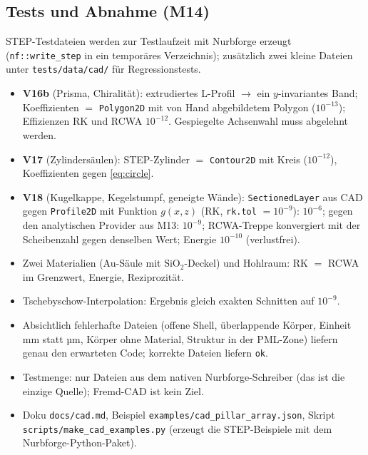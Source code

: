 \subsection{Tests und Abnahme (M14)}
STEP-Testdateien werden zur Testlaufzeit mit Nurbforge erzeugt (\verb|nf::write_step| in ein temporäres
Verzeichnis); zusätzlich zwei kleine Dateien unter \verb|tests/data/cad/| für Regressionstests.
\begin{itemize}[nosep]
  \item \textbf{V16b} (Prisma, Chiralität): extrudiertes L-Profil $\to$ ein $y$-invariantes Band; Koeffizienten
        $=$ \verb|Polygon2D| mit von Hand abgebildetem Polygon ($10^{-13}$); Effizienzen RK und RCWA $10^{-12}$.
        Gespiegelte Achsenwahl muss abgelehnt werden.
  \item \textbf{V17} (Zylindersäulen): STEP-Zylinder $=$ \verb|Contour2D| mit Kreis ($10^{-12}$), Koeffizienten gegen
        \eqref{eq:circle}.
  \item \textbf{V18} (Kugelkappe, Kegelstumpf, geneigte Wände): \verb|SectionedLayer| aus CAD gegen \verb|Profile2D| mit
        Funktion $g(x,z)$ (RK, \verb|rk.tol| $=10^{-9}$): $10^{-6}$; gegen den analytischen Provider aus M13: $10^{-9}$;
        RCWA-Treppe konvergiert mit der Scheibenzahl gegen denselben Wert; Energie $10^{-10}$ (verlustfrei).
  \item Zwei Materialien (Au-Säule mit SiO$_2$-Deckel) und Hohlraum: RK $=$ RCWA im Grenzwert, Energie, Reziprozität.
  \item Tschebyschow-Interpolation: Ergebnis gleich exakten Schnitten auf $10^{-9}$.
  \item Absichtlich fehlerhafte Dateien (offene Shell, überlappende Körper, Einheit mm statt µm, Körper ohne Material,
        Struktur in der PML-Zone) liefern genau den erwarteten Code; korrekte Dateien liefern \verb|ok|.
  \item Testmenge: nur Dateien aus dem nativen Nurbforge-Schreiber (das ist die einzige Quelle); Fremd-CAD ist kein Ziel.
  \item Doku \verb|docs/cad.md|, Beispiel \verb|examples/cad_pillar_array.json|, Skript
        \verb|scripts/make_cad_examples.py| (erzeugt die STEP-Beispiele mit dem Nurbforge-Python-Paket).
\end{itemize}
